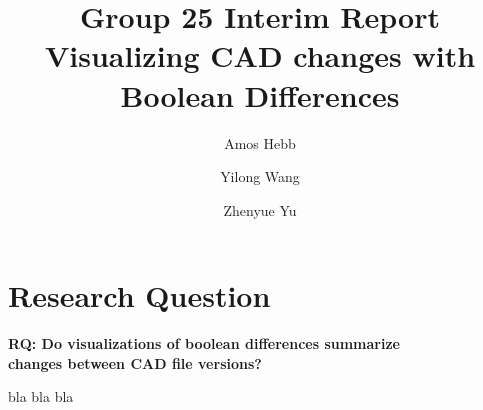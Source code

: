 \documentclass[sigconf,authorversion,nonacm]{acmart}
\begin{document}
\title{Group 25 Interim Report\\Visualizing CAD changes with Boolean Differences}

\author{Amos Hebb}
\author{Yilong Wang}
\author{Zhenyue Yu}
\makeatletter
\def\@ACM@checkaffil{%
	\if@ACM@instpresent\else
		\ClassWarningNoLine{\@classname}{No institution present for an affiliation}%
	\fi
	\if@ACM@citypresent\else
		\ClassWarningNoLine{\@classname}{No city present for an affiliation}%
	\fi
	\if@ACM@countrypresent\else
		\ClassWarningNoLine{\@classname}{No country present for an affiliation}%
	\fi
}
\makeatother

\maketitle

\section{Research Question}

\textbf{RQ: Do visualizations of boolean differences summarize\\changes between CAD file versions?}

bla bla bla~\cite{cheng2023age}


\end{document}
